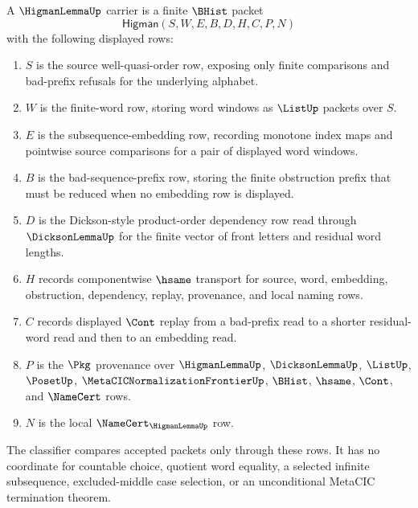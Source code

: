 \begin{definition}
\label{def:higman-lemma-carrier}
A $\HigmanLemmaUp$ carrier is a finite $\BHist$ packet
$$
\mathsf{Higman}(S,W,E,B,D,H,C,P,N)
$$
with the following displayed rows:
\begin{enumerate}
\item $S$ is the source well-quasi-order row, exposing only finite comparisons and bad-prefix refusals for the underlying alphabet.
\item $W$ is the finite-word row, storing word windows as $\ListUp$ packets over $S$.
\item $E$ is the subsequence-embedding row, recording monotone index maps and pointwise source comparisons for a pair of displayed word windows.
\item $B$ is the bad-sequence-prefix row, storing the finite obstruction prefix that must be reduced when no embedding row is displayed.
\item $D$ is the Dickson-style product-order dependency row read through $\DicksonLemmaUp$ for the finite vector of front letters and residual word lengths.
\item $H$ records componentwise $\hsame$ transport for source, word, embedding, obstruction, dependency, replay, provenance, and local naming rows.
\item $C$ records displayed $\Cont$ replay from a bad-prefix read to a shorter residual-word read and then to an embedding read.
\item $P$ is the $\Pkg$ provenance over $\HigmanLemmaUp$, $\DicksonLemmaUp$, $\ListUp$, $\PosetUp$, $\MetaCICNormalizationFrontierUp$, $\BHist$, $\hsame$, $\Cont$, and $\NameCert$ rows.
\item $N$ is the local $\NameCert_{\HigmanLemmaUp}$ row.
\end{enumerate}
The classifier compares accepted packets only through these rows. It has no coordinate for countable choice, quotient word equality, a selected infinite subsequence, excluded-middle case selection, or an unconditional MetaCIC termination theorem.
\end{definition}

